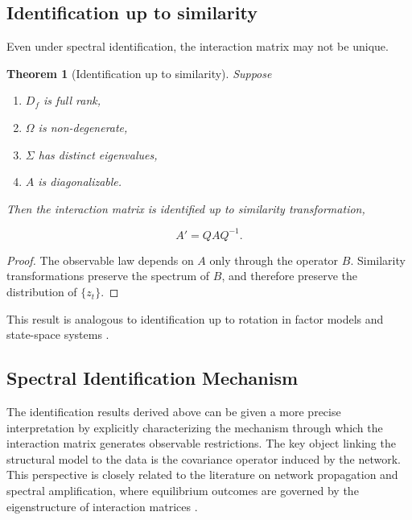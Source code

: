 \documentclass[12pt]{article}
\numberwithin{equation}{section}
\newtheorem{theorem}{Theorem}[section]
\begin{document}
\subsection{Identification up to similarity}

Even under spectral identification, the interaction matrix may not be
unique.

\begin{theorem}[Identification up to similarity]
Suppose

\begin{enumerate}
\item $D_f$ is full rank,
\item $\Omega$ is non-degenerate,
\item $\Sigma$ has distinct eigenvalues,
\item $A$ is diagonalizable.
\end{enumerate}

Then the interaction matrix is identified up to similarity
transformation,

\begin{equation}
A'
=
Q A Q^{-1}.
\label{eq:4.similarity}
\end{equation}

\end{theorem}

\begin{proof}
The observable law depends on $A$ only through the operator $B$.
Similarity transformations preserve the spectrum of $B$, and therefore
preserve the distribution of $\{z_t\}$.
\end{proof}

This result is analogous to identification up to rotation in factor
models and state-space systems
\citep{bai2003inferential, hamilton1994timeseries}.

\subsection{Spectral Identification Mechanism}

The identification results derived above can be given a more precise interpretation by explicitly characterizing the mechanism through which the interaction matrix generates observable restrictions. The key object linking the structural model to the data is the covariance operator induced by the network. This perspective is closely related to the literature on network propagation and spectral amplification, where equilibrium outcomes are governed by the eigenstructure of interaction matrices \citep{acemoglu2012network, acemoglu2015systemic, elliott2014financial}.
\end{document}
